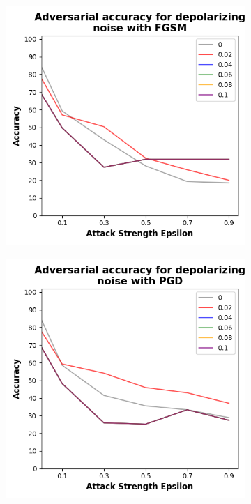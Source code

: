 \begin{figure}[!h]
  \centering

  \begin{subfigure}{0.45\textwidth}
      \includegraphics[width=\linewidth]{figures/evaluation_results/breast-cancer/pqc/figures/depolarizing-fgsm.png}
      \label{fig:bc11}
  \end{subfigure} \qquad
  \begin{subfigure}{0.45\textwidth}
      \includegraphics[width=\linewidth]{figures/evaluation_results/breast-cancer/pqc/figures/depolarizing-pgd.png}

\end{subfigure}
\end{figure}
